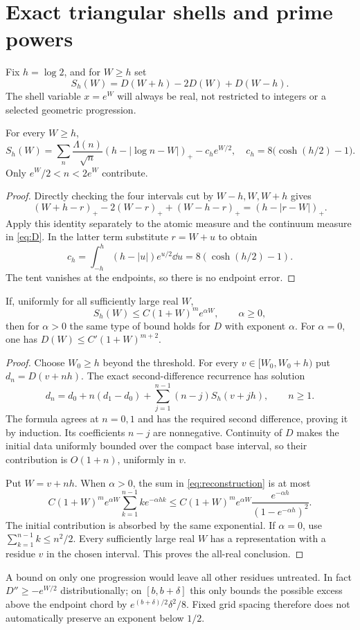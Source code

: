 \section{Exact triangular shells and prime powers}
Fix $h=\log2$, and for $W\ge h$ set
\[
S_h(W)=D(W+h)-2D(W)+D(W-h).
\]
The shell variable $x=e^W$ will always be real, not restricted to integers or a selected geometric progression.
\begin{proposition}
For every $W\ge h$,
\begin{equation}\label{eq:shell}
S_h(W)=\sum_n\frac{\Lambda(n)}{\sqrt n}(h-|\log n-W|)_+-c_he^{W/2},
\quad c_h=8\bigl(\cosh(h/2)-1\bigr).
\end{equation}
Only $e^W/2<n<2e^W$ contribute.
\end{proposition}
\begin{proof}
Directly checking the four intervals cut by $W-h,W,W+h$ gives
\[
(W+h-r)_+-2(W-r)_++(W-h-r)_+=(h-|r-W|)_+.
\]
Apply this identity separately to the atomic measure and the continuum measure in \eqref{eq:D}. In the latter term substitute $r=W+u$ to obtain
\[
c_h=\int_{-h}^h(h-|u|)e^{u/2}\dd u=8(\cosh(h/2)-1).
\]
The tent vanishes at the endpoints, so there is no endpoint error.
\end{proof}
\begin{proposition}\label{prop:reconstruction}
If, uniformly for all sufficiently large real $W$,
\[
S_h(W)\le C(1+W)^me^{\alpha W},\qquad\alpha\ge0,
\]
then for $\alpha>0$ the same type of bound holds for $D$ with exponent $\alpha$. For $\alpha=0$, one has $D(W)\le C'(1+W)^{m+2}$.
\end{proposition}
\begin{proof}
Choose $W_0\ge h$ beyond the threshold. For every $v\in[W_0,W_0+h)$ put $d_n=D(v+nh)$. The exact second-difference recurrence has solution
\begin{equation}\label{eq:reconstruction}
d_n=d_0+n(d_1-d_0)+\sum_{j=1}^{n-1}(n-j)S_h(v+jh),\qquad n\ge1.
\end{equation}
The formula agrees at $n=0,1$ and has the required second difference, proving it by induction. Its coefficients $n-j$ are nonnegative. Continuity of $D$ makes the initial data uniformly bounded over the compact base interval, so their contribution is $O(1+n)$, uniformly in $v$.

Put $W=v+nh$. When $\alpha>0$, the sum in \eqref{eq:reconstruction} is at most
\[
C(1+W)^me^{\alpha W}\sum_{k=1}^{n-1}ke^{-\alpha hk}
\le C(1+W)^me^{\alpha W}\frac{e^{-\alpha h}}{(1-e^{-\alpha h})^2}.
\]
The initial contribution is absorbed by the same exponential. If $\alpha=0$, use $\sum_{k=1}^{n-1}k\le n^2/2$. Every sufficiently large real $W$ has a representation with a residue $v$ in the chosen interval. This proves the all-real conclusion.
\end{proof}
A bound on only one progression would leave all other residues untreated. In fact $D''\ge-e^{W/2}$ distributionally; on $[b,b+\delta]$ this only bounds the possible excess above the endpoint chord by $e^{(b+\delta)/2}\delta^2/8$. Fixed grid spacing therefore does not automatically preserve an exponent below $1/2$.

